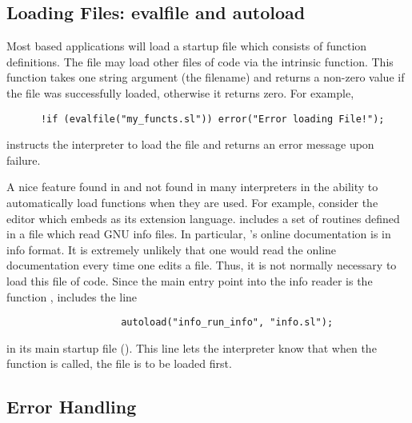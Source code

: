 \subsection{Loading Files: evalfile and autoload}

   Most \slang{} based applications will load a startup file which consists
   of \slang{} function definitions.  The file may load other files of
   \slang{} code via the  intrinsic function.  This function
   takes one string argument (the filename) and returns a non-zero value if
   the file was successfully loaded, otherwise it returns zero.  For
   example,
\begin{verbatim}
      !if (evalfile("my_functs.sl")) error("Error loading File!");
\end{verbatim}
   instructs the interpreter to load the file  and returns an
   error message upon failure.

   A nice feature found in \slang{} and not found in many interpreters in
   the ability to automatically load functions when they are used.  For
   example, consider the \jed{} editor which embeds \slang{} as its
   extension language. \jed{} includes a set of \slang{} routines defined in
   a file  which read GNU info files. In particular, \jed{}'s
   online documentation is in info format. It is extremely unlikely that one
   would read the online documentation every time one edits a file. Thus, it
   is not normally necessary to load this file of \slang{} code.  Since the
   main entry point into the info reader is the function
   , \jed{} includes the line
\begin{verbatim}
                    autoload("info_run_info", "info.sl");
\end{verbatim}
   in its main startup file ().  This line lets the \slang{}
   interpreter know that when the  function is called, the
   file  is to be loaded first.

\subsection{Error Handling}


